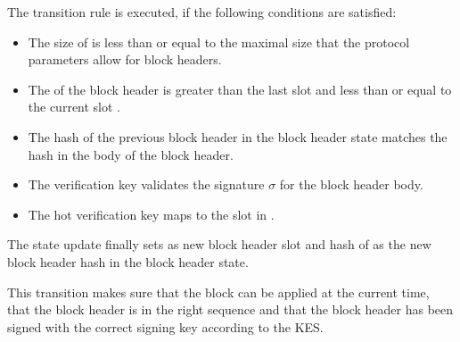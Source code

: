 The transition rule is executed, if the following conditions are satisfied:

\begin{itemize}
\item The size of  is less than or equal to the maximal size that the
  protocol parameters allow for block headers.
\item The  of the block header is greater than the last slot and less
  than or equal to the current slot .
\item The hash  of the previous block header in the block header state
  matches the hash in the body of the block header.
\item The verification key validates the signature $\sigma$ for the block
  header body.
\item The hot verification key  maps to the slot  in
  .
\end{itemize}

The state update finally sets  as new block header slot and hash of
 as the new block header hash in the block header state.

This transition makes sure that the block can be applied at the current time,
that the block header is in the right sequence and that the block header has
been signed with the correct signing key according to the KES.

